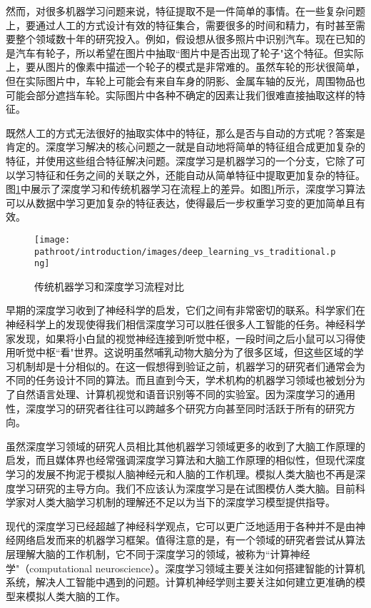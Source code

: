 \documentclass[10pt,a4paper]{ctexbook}
\providecommand{\pathroot}{..}
\begin{document}
然而，对很多机器学习问题来说，特征提取不是一件简单的事情。在一些复杂问题上，要通过人工的方式设计有效的特征集合，需要很多的时间和精力，有时甚至需要整个领域数十年的研究投入。例如，假设想从很多照片中识别汽车。现在已知的是汽车有轮子，所以希望在图片中抽取``图片中是否出现了轮子"这个特征。但实际上，要从图片的像素中描述一个轮子的模式是非常难的。虽然车轮的形状很简单，但在实际图片中，车轮上可能会有来自车身的阴影、金属车轴的反光，周围物品也可能会部分遮挡车轮。实际图片中各种不确定的因素让我们很难直接抽取这样的特征。

既然人工的方式无法很好的抽取实体中的特征，那么是否与自动的方式呢？答案是肯定的。深度学习解决的核心问题之一就是自动地将简单的特征组合成更加复杂的特征，并使用这些组合特征解决问题。深度学习是机器学习的一个分支，它除了可以学习特征和任务之间的关联之外，还能自动从简单特征中提取更加复杂的特征。图\ref{fig:deep_learning_vs_traditional}中展示了深度学习和传统机器学习在流程上的差异。如图\ref{fig:deep_learning_vs_traditional}所示，深度学习算法可以从数据中学习更加复杂的特征表达，使得最后一步权重学习变的更加简单且有效。

\begin{figure}[ht]
    \centering
    \texttt{[image: \\pathroot/introduction/images/deep\_learning\_vs\_traditional.png]}
    \caption{传统机器学习和深度学习流程对比}
    \label{fig:deep_learning_vs_traditional}
\end{figure}

早期的深度学习收到了神经科学的启发，它们之间有非常密切的联系。科学家们在神经科学上的发现使得我们相信深度学习可以胜任很多人工智能的任务。神经科学家发现，如果将小白鼠的视觉神经连接到听觉中枢，一段时间之后小鼠可以习得使用听觉中枢``看"世界。这说明虽然哺乳动物大脑分为了很多区域，但这些区域的学习机制却是十分相似的。在这一假想得到验证之前，机器学习的研究者们通常会为不同的任务设计不同的算法。而且直到今天，学术机构的机器学习领域也被划分为了自然语言处理、计算机视觉和语音识别等不同的实验室。因为深度学习的通用性，深度学习的研究者往往可以跨越多个研究方向甚至同时活跃于所有的研究方向。

虽然深度学习领域的研究人员相比其他机器学习领域更多的收到了大脑工作原理的启发，而且媒体界也经常强调深度学习算法和大脑工作原理的相似性，但现代深度学习的发展不拘泥于模拟人脑神经元和人脑的工作机理。模拟人类大脑也不再是深度学习研究的主导方向。我们不应该认为深度学习是在试图模仿人类大脑。目前科学家对人类大脑学习机制的理解还不足以为当下的深度学习模型提供指导。

现代的深度学习已经超越了神经科学观点，它可以更广泛地适用于各种并不是由神经网络启发而来的机器学习框架。值得注意的是，有一个领域的研究者尝试从算法层理解大脑的工作机制，它不同于深度学习的领域，被称为``计算神经学"（computational neuroscience）。深度学习领域主要关注如何搭建智能的计算机系统，解决人工智能中遇到的问题。计算机神经学则主要关注如何建立更准确的模型来模拟人类大脑的工作。
\end{document}
